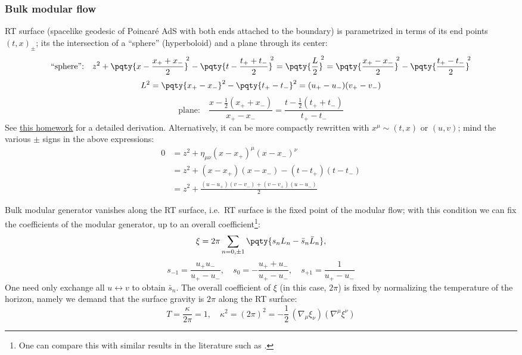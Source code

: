 \documentclass[a4paper
	,10pt
]{article}
\begin{document}
\subsubsection{Bulk modular flow}
	RT surface (spacelike geodesic of Poincar\'e AdS with both ends attached to the boundary) is parametrized in terms of its end points $(t,x)_\pm$; its the intersection of a ``sphere'' (hyperboloid) and a plane through its center:
	\begin{equation}
	\text{``sphere'':}\quad
		z^2
		+ \pqty{x - \frac{x_+ + x_-}{2}}^{\!\!2}
		- \pqty{t - \frac{t_+ + t_-}{2}}^{\!\!2}
		= \pqty{\frac{L}{2}}^{\!\!2}
		= \pqty{\frac{x_+ - x_-}{2}}^{\!\!2}
		- \pqty{\frac{t_+ - t_-}{2}}^{\!\!2}
	\end{equation}
	\begin{equation}
		L^2
		= \pqty{x_+ - x_-}^2
			- \pqty{t_+ - t_-}^2
		= (u_+ - u_-)(v_+ - v_-)
	\end{equation}
	\begin{equation}
	\text{plane:}\quad
		\frac{x - \frac{1}{2} (x_+ + x_-)}{x_+ - x_-}
		= \frac{t - \frac{1}{2} (t_+ + t_-)}{t_+ - t_-}
	\end{equation}
	See \href{https://bryango.github.io/resources/archive/HW-Gravity/gravity1.pdf}{\underline{this homework}} for a detailed derivation. 
	Alternatively, it can be more compactly rewritten with $x^\mu \sim (t,x)$ or $(u,v)$; mind the various $\pm$ signs in the above expressions: 
	\begin{equation}
	\begin{aligned}
		0 &= z^2
			+ \eta_{\mu\nu} (x - x_+)^\mu (x - x_-)^\nu \\
		& = z^2
			+ (x - x_+)(x - x_-)
			- (t - t_+)(t - t_-) \\
		&= z^2 + \frac{
				(u - u_+)(v - v_-)
				+ (v - v_+)(u - u_-)
			}{2}
	\end{aligned}
	\end{equation}
	
	Bulk modular generator vanishes along the RT surface, i.e.~RT surface is the fixed point of the modular flow; with this condition we can fix the coefficients of the modular generator, up to an overall coefficient\footnote{
		One can compare this with similar results in the literature such as \cite{Lashkari:2016idm,Czech:2019vih,Apolo:2020qjm}. 
	}:
	\begin{equation}
		\xi = 2\pi \sum_{n=0,\pm 1} \pqty{
				s_n L_n - \bar{s}_n \bar{L}_n
			},
	\end{equation}
	\begin{equation}
		s_{-1} = \frac{u_+ u_-}{u_+ - u_-},\quad
		s_0 = - \frac{u_+ + u_-}{u_+ - u_-},\quad
		s_{+1} = \frac{1}{u_+ - u_-}
	\end{equation}
	One need only exchange all $u\leftrightarrow v$ to obtain $\bar{s}_n$. The overall coefficient of $\xi$ (in this case, $2\pi$) is fixed by normalizing the temperature of the horizon, namely we demand that the surface gravity is $2\pi$ along the RT surface:
	\begin{equation}
		T = \frac{\kappa}{2\pi} = 1,
	\quad
		\kappa^2
		= (2\pi)^2
		= -\frac{1}{2}\,
			(\nabla_{\mu} \xi_{\nu})
			(\nabla^{\mu} \xi^{\nu})
	\end{equation}
	
\end{document}

